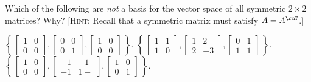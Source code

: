 \begin{questions}
  \question Which of the following are \emph{not} a basis for the vector
  space of all symmetric $2\times 2$ matrices? Why? [\textsc{Hint}: Recall
  that a symmetric matrix must satisfy $A=A^\rmT$.]
  \begin{choices}
    \choice
    $\displaystyle\left\{\,
      \begin{bmatrix}1&0\\0&0\end{bmatrix},
      \begin{bmatrix}0&0\\0&1\end{bmatrix},
      \begin{bmatrix}1&0\\0&0\end{bmatrix}
      \,\right\}$.
    \choice
    $\displaystyle\left\{\,
      \begin{bmatrix}1&1\\1&0\end{bmatrix},
      \begin{bmatrix}1&2\\2&-3\end{bmatrix},
      \begin{bmatrix}0&1\\1&1\end{bmatrix}
      \,\right\}$.
    \choice
    $\displaystyle\left\{\,
      \begin{bmatrix}1&0\\0&0\end{bmatrix},
      \begin{bmatrix}-1&-1\\-1&1-\end{bmatrix},
      \begin{bmatrix}1&0\\0&1\end{bmatrix}
      \,\right\}$.
  \end{choices}


\end{questions}
